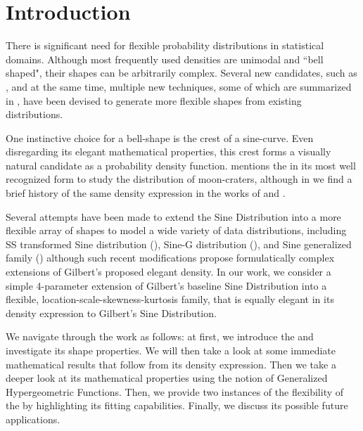 \section{Introduction}
There is significant need for flexible probability distributions in statistical domains. Although most frequently used densities are unimodal and ``bell shaped", their shapes can be arbitrarily complex. Several new candidates, such as \cite{chalabi2012flexible}, and at the same time, multiple new techniques, some of which are summarized in \cite{anusha2024dists}, have been devised to generate more flexible shapes from existing distributions.

One instinctive choice for a bell-shape is the crest of a sine-curve. Even disregarding its elegant mathematical properties, this crest forms a visually natural candidate as a probability density function. \cite{gilbert1893moon} mentions the \sindist{} in its most well recognized form to study the distribution of moon-craters, although in \cite{edwards2000sine} we find a brief history of the same density expression in the works of \cite{lagrange1770memoire} and \cite{pearson1902systematic}.

Several attempts have been made to extend the Sine Distribution into a more flexible array of shapes to model a wide variety of data distributions, including SS transformed Sine distribution (\cite{kumar2015bladder}), Sine-G distribution (\cite{mahmood2019sineg}), and Sine generalized family (\cite{oramulu2024sinegen}) although such recent modifications propose formulatically complex extensions of Gilbert's proposed elegant density. In our work, we consider a simple 4-parameter extension of Gilbert's baseline Sine Distribution into a flexible, location-scale-skewness-kurtosis family, that is equally elegant in its density expression to Gilbert's Sine Distribution.

We navigate through the work as follows: at first, we introduce the \sindist{} and investigate its shape properties. We will then take a look at some immediate mathematical results that follow from its density expression. Then we take a deeper look at its mathematical properties using the notion of Generalized Hypergeometric Functions. Then, we provide two instances of the flexibility of the \sindist{} by highlighting its fitting capabilities. Finally, we discuss its possible future applications.